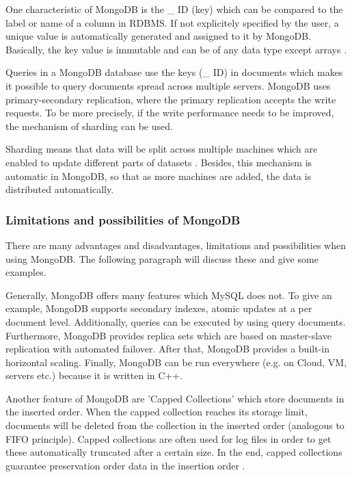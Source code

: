 One characteristic of MongoDB is the {\_} ID (key) which can be compared to the label or name of a column in RDBMS. If not explicitely specified by the user, a unique value is automatically generated and assigned to it by MongoDB. Basically, the key value is immutable and can be of any data type except arrays \cite[p.31 ff.]{mongodb_edward}.

Queries in a MongoDB database use the keys ({\_} ID) in documents which makes it possible to query documents spread across multiple servers. 
MongoDB uses primary-secondary replication, where the primary replication accepts the write requests. To be more precisely, if the write performance needs to be improved, the mechanism of sharding can be used. 

Sharding means that data will be split across multiple machines which are enabled to update different parts of datasets \cite[p.25 ff.]{mongodb_edward}. Besides, this mechanism is automatic in MongoDB, so that as more machines are added, the data is distributed automatically.

\subsubsection{Limitations and possibilities of MongoDB}

There are many advantages and disadvantages, limitations and possibilities when using MongoDB. The following paragraph will discuss these and give some examples.

Generally, MongoDB offers many features which MySQL does not. To give an example, MongoDB supports secondary indexes, atomic updates at a per document level. Additionally, queries can be executed by using query documents. Furthermore, MongoDB provides replica sets which are based on master-slave replication with automated failover. After that, MongoDB provides a built-in horizontal scaling. Finally, MongoDB can be run everywhere (e.g. on Cloud, \ac{VM}, servers etc.) because it is written in C++. 

Another feature of MongoDB are 'Capped Collections' which store documents in the inserted order. When the capped collection reaches its storage limit, documents will be deleted from the collection in the inserted order (analogous to \ac{FIFO} principle). Capped collections are often used for log files in order to get these automatically truncated after a certain size. In the end, capped collections guarantee preservation order data in the insertion order \cite[p.31 ff.]{mongodb_edward}.

